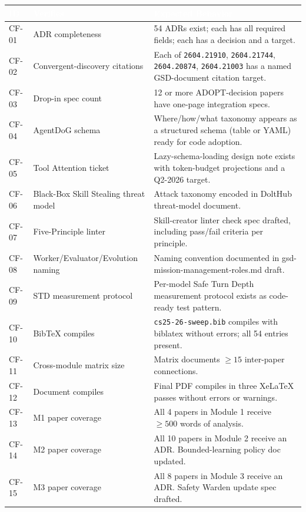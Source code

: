 \documentclass[11pt,letterpaper]{article}
\newcommand{\arxivid}[1]{\texttt{\textcolor{accent}{#1}}}
\newcommand{\tableheader}[1]{\textbf{\sffamily\textcolor{white}{#1}}}
\begin{document}
\begin{center}
\begin{tabularx}{\textwidth}{C{1.2cm}L{4cm}X}
\toprule
{}
\tableheader{ID} & \tableheader{Verifies} & \tableheader{Expected Behavior} \\
\midrule
CF-01 & ADR completeness & 54 ADRs exist; each has all required fields; each has a decision and a target. \\
CF-02 & Convergent-discovery citations & Each of \arxivid{2604.21910}, \arxivid{2604.21744}, \arxivid{2604.20874}, \arxivid{2604.21003} has a named GSD-document citation target. \\
CF-03 & Drop-in spec count & 12 or more ADOPT-decision papers have one-page integration specs. \\
CF-04 & AgentDoG schema & Where/how/what taxonomy appears as a structured schema (table or YAML) ready for code adoption. \\
CF-05 & Tool Attention ticket & Lazy-schema-loading design note exists with token-budget projections and a Q2-2026 target. \\
CF-06 & Black-Box Skill Stealing threat model & Attack taxonomy encoded in DoltHub threat-model document. \\
CF-07 & Five-Principle linter & Skill-creator linter check spec drafted, including pass/fail criteria per principle. \\
CF-08 & Worker/Evaluator/Evolution naming & Naming convention documented in gsd-mission-management-roles.md draft. \\
CF-09 & STD measurement protocol & Per-model Safe Turn Depth measurement protocol exists as code-ready test pattern. \\
CF-10 & BibTeX compiles & \texttt{cs25-26-sweep.bib} compiles with biblatex without errors; all 54 entries present. \\
CF-11 & Cross-module matrix size & Matrix documents ${\geq}15$ inter-paper connections. \\
CF-12 & Document compiles & Final PDF compiles in three XeLaTeX passes without errors or warnings. \\
CF-13 & M1 paper coverage & All 4 papers in Module 1 receive ${\geq}500$ words of analysis. \\
CF-14 & M2 paper coverage & All 10 papers in Module 2 receive an ADR. Bounded-learning policy doc updated. \\
CF-15 & M3 paper coverage & All 8 papers in Module 3 receive an ADR. Safety Warden update spec drafted. \\

\end{tabularx}
\end{center}
\end{document}
